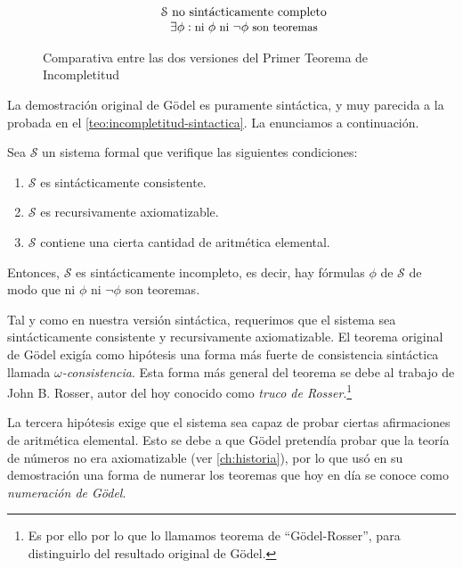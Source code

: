 \begin{figure}[H]
$$\begin{array}{ccc}
{    }
    & &
    {
        \begin{matrix}
            \tiny{\;}\\
            \mathcal{S}\text{ no sintácticamente completo}\\
            \small{\exists\phi:\text{ni }\phi\text{ ni }\neg\phi\text{ son teoremas}}
        \end{matrix}
    }
    \\
\end{array}
$$
\caption{Comparativa entre las dos versiones del Primer Teorema de Incompletitud}
\vspace{-8pt}
\label{fig:comparativa-incompletitud}
\end{figure}

La demostración original de Gödel es puramente sintáctica, y muy parecida a la probada en el \cref{teo:incompletitud-sintactica}. La enunciamos a continuación.

\begin{teorema}\label{teo:incompletitud-godel}
Sea $\mathcal{S}$ un sistema formal que verifique las siguientes condiciones:
\begin{enumerate}[label=(\arabic*)]
    \item $\mathcal{S}$ es sintácticamente consistente.
    \item $\mathcal{S}$ es recursivamente axiomatizable.
    \item $\mathcal{S}$ contiene una cierta cantidad de aritmética elemental.
\end{enumerate}

Entonces, $\mathcal{S}$ es sintácticamente incompleto, es decir, hay fórmulas $\phi$ de $\mathcal{S}$ de modo que ni $\phi$ ni $\neg\phi$ son teoremas.
\end{teorema}

Tal y como en nuestra versión sintáctica, requerimos que el sistema sea sintácticamente consistente y recursivamente axiomatizable. El teorema original de Gödel exigía como hipótesis una forma más fuerte de consistencia sintáctica llamada \emph{$\omega$-consistencia}. Esta forma más general del teorema se debe al trabajo de John B. Rosser, autor del hoy conocido como \emph{truco de Rosser}.\footnote{Es por ello por lo que lo llamamos teorema de ``Gödel-Rosser'', para distinguirlo del resultado original de Gödel.} \cite{Rosser1936}

La tercera hipótesis exige que el sistema sea capaz de probar ciertas afirmaciones de aritmética elemental. Esto se debe a que Gödel pretendía probar que la teoría de números no era axiomatizable (ver \cref{ch:historia}), por lo que usó en su demostración una forma de numerar los teoremas que hoy en día se conoce como \emph{numeración de Gödel}.


